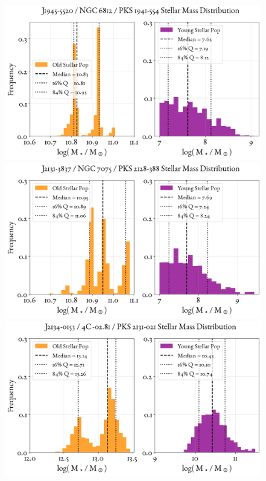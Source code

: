 \begin{figure}
    \centering
    \includegraphics[width=0.8\linewidth]{figures/ResultMasses/72_MassDistri_4721.png}\\
    \includegraphics[width=0.8\linewidth]{figures/ResultMasses/77_MassDistri_4818.png}\\
    \includegraphics[width=0.8\linewidth]{figures/ResultMasses/79_MassDistri_4827.png}    
\end{figure}
